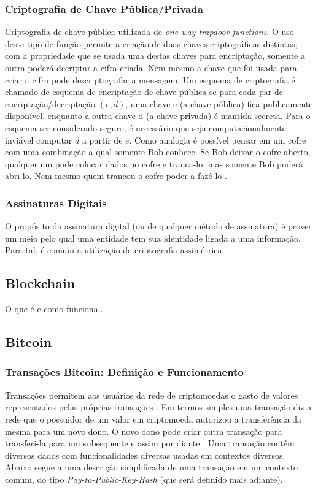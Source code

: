 \documentclass[
	article,			%
	11pt,				%
	oneside,			%
	a4paper,			%
	chapter=TITLE,		%
	section=TITLE,		%
	subsection=TITLE,	%
	subsubsection=TITLE, %
	english,			%
	brazil,				%
	sumario=tradicional
	]{ifrs-artigo-abntex2}
\begin{document}
\subsubsection{Criptografia de Chave Pública/Privada}
Criptografia de chave pública utilizada de \textit{one-way trapdoor functions}. O uso deste tipo de função permite a criação de duas chaves criptográficas distintas, com a propriedade que se usada uma destas chaves para encriptação, somente a outra poderá decriptar a cifra criada. Nem mesmo a chave que foi usada para criar a cifra pode descriptografar a mensagem. Um esquema de criptografia é chamado de esquema de encriptação de chave-pública se para cada par de encriptação/decriptação $(e,d)$, uma chave e (a chave pública) fica publicamente disponível, enquanto a outra chave d (a chave privada) é mantida secreta. Para o esquema ser considerado seguro, é necessário que seja computacionalmente  inviável computar $d$ a partir de $e$. Como analogia é possível pensar em um cofre com uma combinação a qual somente Bob conhece. Se Bob deixar o cofre aberto, qualquer um pode colocar dados no cofre e tranca-lo, mas somente Bob poderá abri-lo. Nem mesmo quem trancou o cofre poder-a fazê-lo \cite{katz1996handbook}.

\subsubsection{Assinaturas Digitais}
O propósito da assinatura digital (ou de qualquer método de assinatura) é prover um meio pelo qual uma entidade tem sua identidade ligada a uma informação. Para tal, é comum a utilização de criptografia assimétrica.

\subsection{Blockchain}
O que é e como funciona...

\subsection{Bitcoin}

\subsubsection{Transações Bitcoin: Definição e Funcionamento}
Transações permitem aos usuários da rede de criptomoedas o gasto de valores representados pelas próprias transações \cite{bitcoinDev}. Em termos simples uma transação diz a rede que o possuidor de um valor em criptomoeda autorizou a transferência da mesma para um novo dono. O novo dono pode criar outra transação para transferi-la para um subsequente e assim por diante \cite{masterBit}.
Uma transação contém diversos dados com funcionalidades diversas usadas em contextos diversos. Abaixo segue a uma descrição simplificada de uma transação em um contexto comum, do tipo \textit{Pay-to-Public-Key-Hash} (que será definido mais adiante).
\end{document}
